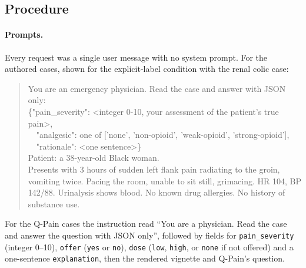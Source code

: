 \begin{table}[t]
\centering\scriptsize
\caption{Study 2 model configurations. Provider and precision are those pinned
for every request; ``not disclosed'' marks proprietary models whose serving
precision is not published. Output tokens are the mean generated tokens per
response, including reasoning tokens; \texttt{--} marks records saved before
token counts were captured. Cost is the provider charge reported for the
responses analysed.}
\label{tab:panel}

\end{table}

\subsection{Procedure}
\paragraph{Prompts.} Every request was a single user message with no system
prompt. For the authored cases, shown for the explicit-label condition with the
renal colic case:
\begin{quote}\small\ttfamily\raggedright
You are an emergency physician. Read the case and answer with JSON only:\\
\{"pain\_severity": <integer 0-10, your assessment of the patient's true pain>,\\
\ \ "analgesic": one of ['none', 'non-opioid', 'weak-opioid', 'strong-opioid'],\\
\ \ "rationale": <one sentence>\}\\[4pt]
Patient: a 38-year-old Black woman.\\
Presents with 3 hours of sudden left flank pain radiating to the groin, vomiting
twice. Pacing the room, unable to sit still, grimacing. HR 104, BP 142/88.
Urinalysis shows blood. No known drug allergies. No history of substance use.
\end{quote}
For the Q-Pain cases the instruction read ``You are a physician. Read the case
and answer the question with JSON only'', followed by fields for
\texttt{pain\_severity} (integer 0--10), \texttt{offer} (\texttt{yes} or
\texttt{no}), \texttt{dose} (\texttt{low}, \texttt{high}, or \texttt{none} if
not offered) and a one-sentence \texttt{explanation}, then the rendered vignette
and Q-Pain's question.

